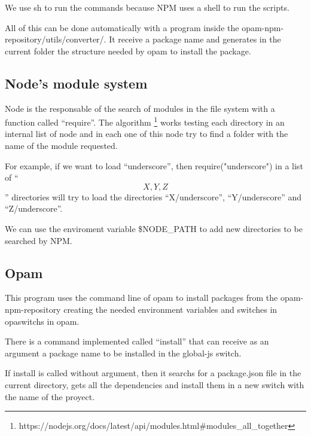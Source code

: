 \documentclass[letterpaper,12pt]{report}
\begin{document}
We use sh to run the commands because NPM uses a shell to run the scripts.

All of this can be done automatically with a program inside the
opam-npm-repository/utils/converter/. It receive a package name and generates
in the current folder the structure needed by opam to install the package.


\subsection{Node's module system}

Node is the responsable of the search of modules in the file system with a
function called ``require''. The algorithm
\footnote{https://nodejs.org/docs/latest/api/modules.html\#modules\_all\_together}
works testing each directory in an internal list of node and in each one of this
node try to find a folder with the name of the module requested.

For example, if we want to load ``underscore'', then require("underscore") in a
list of ``\[X, Y, Z\]'' directories will try to load the directories
``X/underscore'', ``Y/underscore'' and ``Z/underscore''.

We can use the enviroment variable \$NODE\_PATH to add new directories to be
searched by NPM.

\subsection{Opam}

This program uses the command line of opam to install packages from the
opam-npm-repository creating the needed environment variables and switches in
opaswitchs in opam.

There is a command implemented called ``install'' that can receive as an
argument a package name to be installed in the global-js switch.

If install is called without argument, then it searchs for a package.json file
in the current directory, gets all the dependencies and install them in a new
switch with the name of the proyect.
\end{document}
